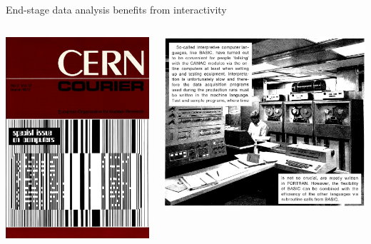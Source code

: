 \documentclass[aspectratio=169]{beamer}
\begin{document}
\begin{frame}{End-stage data analysis benefits from interactivity}
\vspace{0.25 cm}
\begin{columns}
\includegraphics[width=\linewidth]{PLOTS/cern-courier-2.png}

\includegraphics[width=\linewidth]{PLOTS/cern-courier-basic.png}
\end{columns}
\end{frame}
\end{document}
